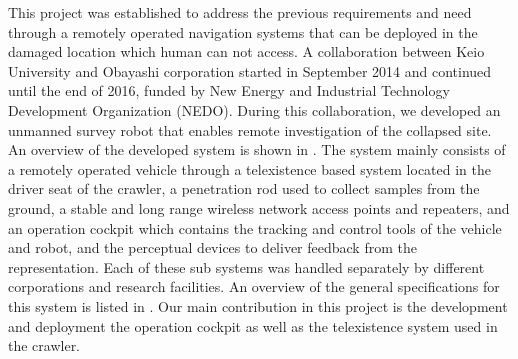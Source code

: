 This project was established to address the previous requirements and need through a remotely operated navigation systems that can be deployed in the damaged location which human can not access. A collaboration between Keio University and Obayashi corporation started in September 2014 and continued until the end of 2016, funded by New Energy and Industrial Technology Development Organization (NEDO). During this collaboration, we developed an unmanned survey robot that enables remote investigation of the collapsed site. An overview of the developed system is shown in . The system mainly consists of a remotely operated vehicle through a telexistence based system located in the driver seat of the crawler, a penetration rod used to collect samples from the ground, a stable and long range wireless network access points and repeaters, and an operation cockpit which contains the tracking and control tools of the vehicle and robot, and the perceptual devices to deliver feedback from the representation. Each of these sub systems was handled separately by different corporations and research facilities. An overview of the general specifications for this system is listed in . Our main contribution in this project is the development and deployment the operation cockpit as well as the telexistence system used in the crawler.



